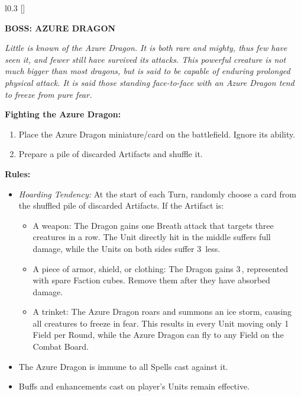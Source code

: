 \begin{wrapfigure}{l}{0.3\textwidth}
  \raisebox{0pt}[\dimexpr{}\baselineskip\relax]{}
\end{wrapfigure}
{
  \textbf{\MakeUppercase{Boss: Azure Dragon}}

  \medskip

  \textit{Little is known of the Azure Dragon.
    It is both rare and mighty, thus few have seen it, and fewer still have survived its attacks.
    This powerful creature is not much bigger than most dragons, but is said to be capable of enduring prolonged physical attack.
    It is said those standing face-to-face with an Azure Dragon tend to freeze from pure fear.
  }

  \medskip

  \textbf{Fighting the Azure Dragon:}
  \begin{enumerate}
    \item Place the Azure Dragon miniature/card on the battlefield.
      Ignore its ability.
    \item Prepare a pile of discarded Artifacts and shuffle it.
  \end{enumerate}

  \medskip

  \textbf{Rules:}
  \begin{itemize}
    \item \textit{Hoarding Tendency:} At the start of each Turn, randomly choose a card from the shuffled pile of discarded Artifacts.
      If the Artifact is:
      \begin{itemize}
        \item A weapon: The Dragon gains one Breath attack that targets three creatures in a row.
          The Unit directly hit in the middle suffers full damage, while the Units on both sides suffer 3\, less.
        \item A piece of armor, shield, or clothing: The Dragon gains 3\,, represented with spare Faction cubes.
          Remove them after they have absorbed damage.
        \item A trinket: The Azure Dragon roars and summons an ice storm, causing all creatures to freeze in fear.
          This results in every Unit moving only 1 Field per Round, while the Azure Dragon can fly to any Field on the Combat Board.
      \end{itemize}
    \item The Azure Dragon is immune to all Spells cast against it.
    \item Buffs and enhancements cast on player's Units remain effective.
  \end{itemize}
}

